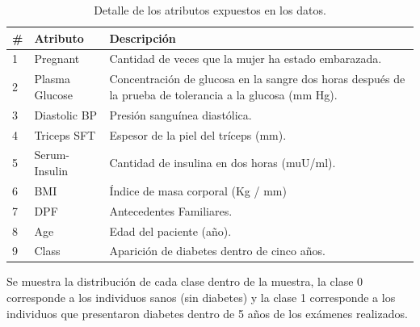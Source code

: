 \documentclass[letter, titlepage, 10pt]{article}
\begin{document}
\begin{table}[H]
\centering
\begin{tabular}{|l|l|p{12cm}|}
\hline
\textbf{\#} & \textbf{Atributo} & \textbf{Descripción}                                                                                                    \\ \hline
1           & Pregnant          & Cantidad de veces que la mujer ha estado embarazada.                                                                    \\ \hline
2           & Plasma Glucose    & Concentración de glucosa en la sangre dos horas después de la prueba de tolerancia a la glucosa (mm Hg). \\ \hline
3           & Diastolic BP      & Presión sanguínea diastólica.                                                                                           \\ \hline
4           & Triceps SFT       & Espesor de la piel del tríceps (mm).                                                                            \\ \hline
5           & Serum-Insulin     & Cantidad de insulina en dos horas (muU/ml).                                                                                   \\ \hline
6           & BMI               & Índice de masa corporal (Kg / mm)                                                                       \\ \hline
7           & DPF               & Antecedentes Familiares.                                                                                          \\ \hline
8           & Age               & Edad del paciente (año).                                                                                                \\ \hline
9           & Class             & Aparición de diabetes dentro de cinco años.                                                                             \\ \hline
\end{tabular}
\caption{Detalle de los atributos expuestos en los datos.}
\end{table}

Se muestra la distribución de cada clase dentro de la muestra, la clase 0 corresponde a los individuos sanos (sin diabetes) y la clase 1 corresponde a los individuos que presentaron diabetes dentro de 5 años de los exámenes realizados.
\end{document}
